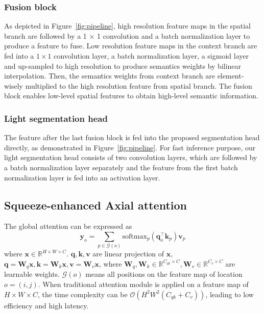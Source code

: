 \subsubsection{Fusion block}
As depicted in Figure~\ref{fig:pipeline}, high resolution feature maps in the spatial branch are followed by a 1 × 1 convolution and a batch normalization layer to produce a feature to fuse. 
Low resolution feature maps in the context branch are fed into a $1 \times 1$ convolution layer, a batch normalization layer, a sigmoid layer and up-sampled to high resolution to produce semantics weights by bilinear interpolation. 
Then, the semantics weights from context branch are element-wisely multiplied to the high resolution feature from spatial branch.
The fusion block enables low-level spatial features to obtain high-level semantic information.

\subsubsection{Light segmentation head}
The feature after the last fusion block is fed into the proposed segmentation head directly, as demonstrated in Figure~\ref{fig:pipeline}. 
For fast inference purpose, our light segmentation head consists of two convolution layers, which are followed by a batch normalization layer separately and the feature from the first batch normalization layer is fed into an activation layer.

\subsection{Squeeze-enhanced Axial attention}
\label{sec:sea_attn}
The global attention can be expressed as 
\begin{equation}
    \mathbf{y}_o = \sum_{p\in \mathcal{G}(o)} \text{softmax}_p\left(\mathbf{q}_o^\top \mathbf{k}_p \right)\mathbf{v}_p
\end{equation}
where $\mathbf{x}\in \mathbb{R}^{H\times W\times C}$. $\mathbf{q,k,v}$ are linear projection of $\mathbf{x}$, \ie $\mathbf{q}=\mathbf{W}_q\mathbf{x}, \mathbf{k}=\mathbf{W}_k\mathbf{x}, \mathbf{v}=\mathbf{W}_v\mathbf{x}$, where $\mathbf{W}_q, \mathbf{W}_k\in \mathbb{R}^{C_{qk}\times C}, \mathbf{W}_v\in \mathbb{R}^{C_v\times C}$ are learnable weights. $\mathcal{G}(o)$ means all positions on the feature map of location $o=(i, j)$.
When traditional attention module is applied on a feature map of $H\times W\times C$, the time complexity can be $\mathcal{O}(H^2 W^2(C_{qk}+C_v))$, leading to low efficiency and high latency. 

